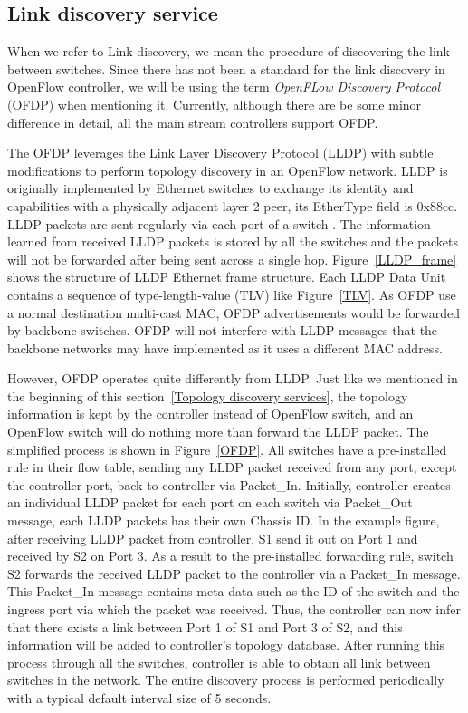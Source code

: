 \subsection{Link discovery service}
\label{Link discovery service}
When we refer to Link discovery, we mean the procedure of discovering the link between switches. Since there has not been a standard for the link discovery in OpenFlow controller, we will be using the term \textit{OpenFLow Discovery Protocol} (OFDP) when mentioning it. Currently, although there are be some minor difference in detail, all the main stream controllers support OFDP.

The OFDP leverages the Link Layer Discovery Protocol (LLDP) with subtle modifications to perform topology discovery in an OpenFlow network. LLDP is originally implemented by Ethernet switches to exchange its identity and capabilities with a physically adjacent layer 2 peer, its EtherType field is 0x88cc. LLDP packets are sent regularly via each port of a switch \cite{LLDP_WS}. The information learned from received LLDP packets is stored by all the switches and the packets will not be forwarded after being sent across a single hop. Figure~\ref{LLDP_frame} shows the structure of LLDP Ethernet frame structure. Each LLDP Data Unit contains a sequence of type-length-value (TLV) like Figure~\ref{TLV}. As OFDP use a normal destination multi-cast MAC, OFDP advertisements would be forwarded by backbone switches. OFDP will not interfere with LLDP messages that the backbone networks may have implemented as it uses a different MAC address. \cite{OFDP_GENI}

However, OFDP operates quite differently from LLDP. Just like we mentioned in the beginning of this section~\ref{Topology discovery services}, the topology information is kept by the controller instead of OpenFlow switch, and an OpenFlow switch will do nothing more than forward the LLDP packet. The simplified process is shown in Figure~\ref{OFDP}. All switches have a pre-installed rule in their flow table, sending any LLDP packet received from any port, except the controller port, back to controller via Packet\_In. Initially, controller creates an individual LLDP packet for each port on each switch via Packet\_Out message, each LLDP packets has their own Chassis ID. In the example figure, after receiving LLDP packet from controller, S1 send it out on Port 1 and received by S2 on Port 3. As a result to the pre-installed forwarding rule, switch S2 forwards the received LLDP packet to the controller via a Packet\_In message. This Packet\_In message contains meta data such as the ID of the switch and the ingress port via which the packet was received. Thus, the controller can now infer that there exists a link between Port 1 of S1 and Port 3 of S2, and this information will be added to controller's topology database. After running this process through all the switches, controller is able to obtain all link between switches in the network. The entire discovery process is performed periodically with a typical default interval size of 5 seconds. \cite{PPTI14}


